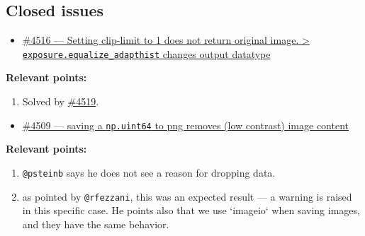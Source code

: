 \documentclass[11pt]{article}
\begin{document}
\subsection{Closed issues}
\label{sec:org68efdd9}

\begin{itemize}
\item \href{https://github.com/scikit-image/scikit-image/issues/4516}{\#4516 — Setting clip-limit to 1 does not return original image. > \texttt{exposure.equalize\_adapthist} changes output datatype}
\end{itemize}

\textbf{Relevant points:}
\begin{enumerate}
\item Solved by \href{https://github.com/scikit-image/scikit-image/pull/4519}{\#4519}.
\end{enumerate}
\begin{itemize}
\item \href{https://github.com/scikit-image/scikit-image/issues/4509}{\#4509 — saving a \texttt{np.uint64} to png removes (low contrast) image content}
\end{itemize}

\textbf{Relevant points:}
\begin{enumerate}
\item \texttt{@psteinb} says he does not see a reason for dropping data.
\item as pointed by \texttt{@rfezzani}, this was an expected result — a warning is
raised in this specific case. He points also that we use `imageio`
when saving images, and they have the same behavior.
\end{enumerate}
\end{document}
